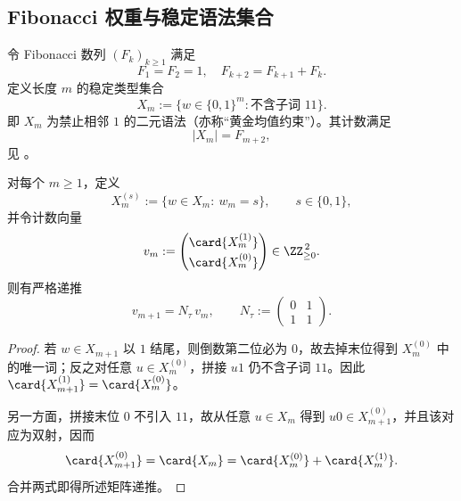 \subsection{Fibonacci 权重与稳定语法集合}\label{subsec:folding-fibonacci-stable-syntax}

令 Fibonacci 数列 $(F_k)_{k\ge1}$ 满足
\[
F_1=F_2=1,\quad F_{k+2}=F_{k+1}+F_k.
\]
定义长度 $m$ 的稳定类型集合
\[
X_m:=\{w\in\{0,1\}^m:\text{不含子词 }11\}.
\]
即 $X_m$ 为禁止相邻 $1$ 的二元语法（亦称“黄金均值约束”）。其计数满足
\[
|X_m|=F_{m+2},
\]
见 \cite{LindMarcus1995}。

\begin{proposition}\label{prop:folding-stable-syntax-terminal-recursion}
对每个 $m\ge 1$，定义
\[
X_m^{(s)}:=\{w\in X_m:\ w_m=s\},\qquad s\in\{0,1\},
\]
并令计数向量
\[
v_m:=\begin{pmatrix}\card{X_m^{(1)}}\\[2pt]\card{X_m^{(0)}}\end{pmatrix}\in\ZZ_{\ge0}^{\,2}.
\]
则有严格递推
\[
v_{m+1}=N_\tau\,v_m,\qquad
N_\tau:=\begin{pmatrix}0&1\\[2pt]1&1\end{pmatrix}.
\]
\end{proposition}
\begin{proof}
若 $w\in X_{m+1}$ 以 $1$ 结尾，则倒数第二位必为 $0$，故去掉末位得到 $X_m^{(0)}$ 中的唯一词；反之对任意 $u\in X_m^{(0)}$，拼接 $u1$ 仍不含子词 $11$。因此 $\card{X_{m+1}^{(1)}}=\card{X_m^{(0)}}$。
\par
另一方面，拼接末位 $0$ 不引入 $11$，故从任意 $u\in X_m$ 得到 $u0\in X_{m+1}^{(0)}$，并且该对应为双射，因而
\[
\card{X_{m+1}^{(0)}}=\card{X_m}=\card{X_m^{(0)}}+\card{X_m^{(1)}}.
\]
合并两式即得所述矩阵递推。
\end{proof}

